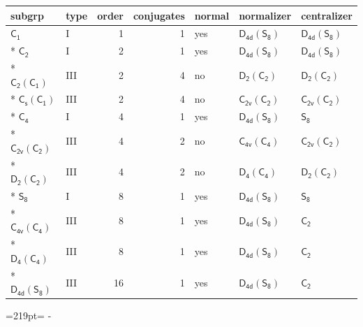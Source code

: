 \documentclass[10pt,a4paper]{article}
\newcommand{\needspace}[1]{\par\penalty-100\begingroup\dimen0=#1\relax\dimen2=\pagegoal
  \advance\dimen2-\pagetotal\ifdim\dimen0>\dimen2\relax\ifdim\dimen2>0pt\vfil\break\fi\fi
  \endgroup}
\numberwithin{equation}{section}
\newcommand{\grp}[1]{\mathsf{#1}}
\begin{document}
{\small\begin{longtable}{@{}llrrlll@{}}\toprule
subgrp & type & order & conjugates & normal & normalizer & centralizer\\\midrule\endhead
\bottomrule\endfoot\endlastfoot
\href{../../../rotation/data/pdf/C1.pdf}{$\grp{C_{1}}$} & I & 1 & 1 & yes & \href{D4d-S8.pdf}{$\grp{D_{4d}}(\grp{S_{8}})$} & \href{D4d-S8.pdf}{$\grp{D_{4d}}(\grp{S_{8}})$}\\*
\href{../../../rotation/data/pdf/C2.pdf}{$\grp{C_{2}}$} & I & 2 & 1 & yes & \href{D4d-S8.pdf}{$\grp{D_{4d}}(\grp{S_{8}})$} & \href{D4d-S8.pdf}{$\grp{D_{4d}}(\grp{S_{8}})$}\\*
\href{C2-C1.pdf}{$\grp{C_{2}}(\grp{C_{1}})$} & III & 2 & 4 & no & \href{D2-C2.pdf}{$\grp{D_{2}}(\grp{C_{2}})$} & \href{D2-C2.pdf}{$\grp{D_{2}}(\grp{C_{2}})$}\\*
\href{C1v-C1.pdf}{$\grp{C_{s}}(\grp{C_{1}})$} & III & 2 & 4 & no & \href{C2v-C2.pdf}{$\grp{C_{2v}}(\grp{C_{2}})$} & \href{C2v-C2.pdf}{$\grp{C_{2v}}(\grp{C_{2}})$}\\*
\href{../../../rotation/data/pdf/C4.pdf}{$\grp{C_{4}}$} & I & 4 & 1 & yes & \href{D4d-S8.pdf}{$\grp{D_{4d}}(\grp{S_{8}})$} & \href{../../../rotation/data/pdf/S8.pdf}{$\grp{S_{8}}$}\\*
\href{C2v-C2.pdf}{$\grp{C_{2v}}(\grp{C_{2}})$} & III & 4 & 2 & no & \href{C4v-C4.pdf}{$\grp{C_{4v}}(\grp{C_{4}})$} & \href{C2v-C2.pdf}{$\grp{C_{2v}}(\grp{C_{2}})$}\\*
\href{D2-C2.pdf}{$\grp{D_{2}}(\grp{C_{2}})$} & III & 4 & 2 & no & \href{D4-C4.pdf}{$\grp{D_{4}}(\grp{C_{4}})$} & \href{D2-C2.pdf}{$\grp{D_{2}}(\grp{C_{2}})$}\\*
\href{../../../rotation/data/pdf/S8.pdf}{$\grp{S_{8}}$} & I & 8 & 1 & yes & \href{D4d-S8.pdf}{$\grp{D_{4d}}(\grp{S_{8}})$} & \href{../../../rotation/data/pdf/S8.pdf}{$\grp{S_{8}}$}\\*
\href{C4v-C4.pdf}{$\grp{C_{4v}}(\grp{C_{4}})$} & III & 8 & 1 & yes & \href{D4d-S8.pdf}{$\grp{D_{4d}}(\grp{S_{8}})$} & \href{../../../rotation/data/pdf/C2.pdf}{$\grp{C_{2}}$}\\*
\href{D4-C4.pdf}{$\grp{D_{4}}(\grp{C_{4}})$} & III & 8 & 1 & yes & \href{D4d-S8.pdf}{$\grp{D_{4d}}(\grp{S_{8}})$} & \href{../../../rotation/data/pdf/C2.pdf}{$\grp{C_{2}}$}\\*
\href{D4d-S8.pdf}{$\grp{D_{4d}}(\grp{S_{8}})$} & III & 16 & 1 & yes & \href{D4d-S8.pdf}{$\grp{D_{4d}}(\grp{S_{8}})$} & \href{../../../rotation/data/pdf/C2.pdf}{$\grp{C_{2}}$}\\
\bottomrule\end{longtable}}
\needspace{219pt}
\end{document}

